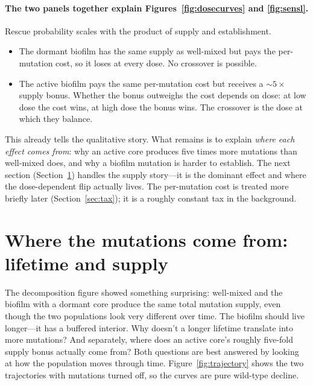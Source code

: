 \documentclass[11pt]{article}
\begin{document}
\paragraph{The two panels together explain Figures~\ref{fig:dosecurves}
and \ref{fig:sensl}.}
Rescue probability scales with the product of supply and
establishment.
\begin{itemize}[noitemsep,topsep=0pt]
    \item The dormant biofilm has the same supply as well-mixed but
    pays the per-mutation cost, so it loses at every dose. No
    crossover is possible.
    \item The active biofilm pays the same per-mutation cost but
    receives a $\sim 5\times$ supply bonus. Whether the bonus
    outweighs the cost depends on dose: at low dose the cost wins,
    at high dose the bonus wins. The crossover is the dose at which
    they balance.
\end{itemize}

This already tells the qualitative story. What remains is to explain
\emph{where each effect comes from}: why an active core produces
five times more mutations than well-mixed does, and why a biofilm
mutation is harder to establish. The next section
(Section~\ref{sec:supply}) handles the supply story---it is the
dominant effect and where the dose-dependent flip actually lives.
The per-mutation cost is treated more briefly later
(Section~\ref{sec:tax}); it is a roughly constant tax in the
background.

\section{Where the mutations come from: lifetime and supply}
\label{sec:supply}

The decomposition figure showed something surprising: well-mixed and the
biofilm with a dormant core produce the same total mutation supply,
even though the two populations look very different over time. The
biofilm should live longer---it has a buffered interior. Why doesn't a
longer lifetime translate into more mutations? And separately, where
does an active core's roughly five-fold supply bonus actually come
from? Both questions are best answered by looking at how the population
moves through time. Figure~\ref{fig:trajectory} shows the two
trajectories with mutations turned off, so the curves are pure
wild-type decline.
\end{document}
